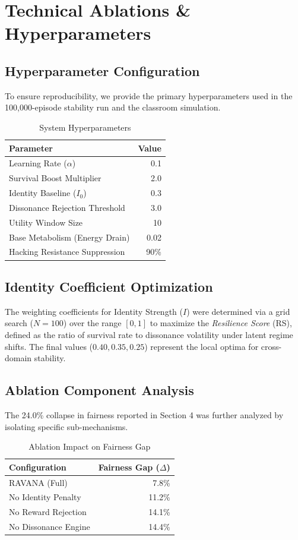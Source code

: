 \documentclass[11pt,twocolumn]{article}
\begin{document}
\appendix
\section{Technical Ablations \& Hyperparameters}

\subsection{Hyperparameter Configuration}
To ensure reproducibility, we provide the primary hyperparameters used in the 100,000-episode stability run and the classroom simulation.

\begin{table}[H]
\centering
\small
\caption{System Hyperparameters}
\begin{tabular}{lr}
\toprule
Parameter & Value \\
\midrule
Learning Rate ($\alpha$) & 0.1 \\
Survival Boost Multiplier & 2.0 \\
Identity Baseline ($I_0$) & 0.3 \\
Dissonance Rejection Threshold & 3.0 \\
Utility Window Size & 10 \\
Base Metabolism (Energy Drain) & 0.02 \\
Hacking Resistance Suppression & 90\% \\
\bottomrule
\end{tabular}
\end{table}

\subsection{Identity Coefficient Optimization}
The weighting coefficients for Identity Strength ($I$) were determined via a grid search ($N=100$) over the range $[0, 1]$ to maximize the \textit{Resilience Score} (RS), defined as the ratio of survival rate to dissonance volatility under latent regime shifts. The final values ($0.40, 0.35, 0.25$) represent the local optima for cross-domain stability.

\subsection{Ablation Component Analysis}
The 24.0\% collapse in fairness reported in Section 4 was further analyzed by isolating specific sub-mechanisms.

\begin{table}[H]
\centering
\small
\caption{Ablation Impact on Fairness Gap}
\begin{tabular}{lr}
\toprule
Configuration & Fairness Gap ($\Delta$) \\
\midrule
RAVANA (Full) & 7.8\% \\
No Identity Penalty & 11.2\% \\
No Reward Rejection & 14.1\% \\
No Dissonance Engine & 14.4\% \\
\bottomrule
\end{tabular}
\end{table}
\end{document}
